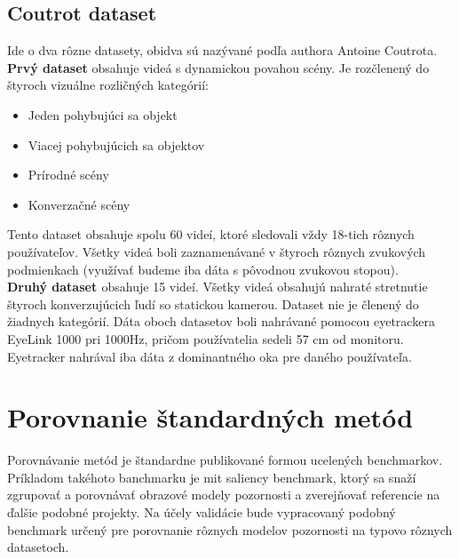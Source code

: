 \subsection{Coutrot dataset}
Ide o dva rôzne datasety, obidva sú nazývané podľa authora Antoine Coutrota.
\textbf{Prvý dataset\cite{sound-1}} obsahuje videá s dynamickou povahou scény.
Je rozčlenený do štyroch vizuálne rozličných kategórií:
\begin{itemize}
  \item Jeden pohybujúci sa objekt
  \item Viacej pohybujúcich sa objektov
  \item Prírodné scény
  \item Konverzačné scény
\end{itemize}
Tento dataset obsahuje spolu 60 videí, ktoré sledovali vždy 18-tich rôznych používateľov.
Všetky videá boli zaznamenávané v štyroch rôznych zvukových podmienkach (využívať budeme iba dáta s pôvodnou zvukovou stopou). \\
\textbf{Druhý dataset \cite{coutrot-database-2}} obsahuje 15 videí.
Všetky videá obsahujú nahraté stretnutie štyroch konverzujúcich ľudí so statickou kamerou.
Dataset nie je členený do žiadnych kategórií.
Dáta oboch datasetov boli nahrávané pomocou eyetrackera EyeLink 1000 pri 1000Hz, pričom používatelia sedeli 57 cm od monitoru.
Eyetracker nahrával iba dáta z dominantného oka pre daného používateľa.

\section{Porovnanie štandardných metód}
Porovnávanie metód je štandardne publikované formou ucelených benchmarkov.
Príkladom takéhoto banchmarku je mit saliency benchmark\cite{mit-saliency-benchmark}, ktorý sa snaží zgrupovať a porovnávať obrazové modely pozornosti a zverejňovať referencie na ďalšie podobné projekty.
Na účely validácie bude vypracovaný podobný benchmark určený pre porovnanie rôznych modelov pozornosti na typovo rôznych datasetoch.
